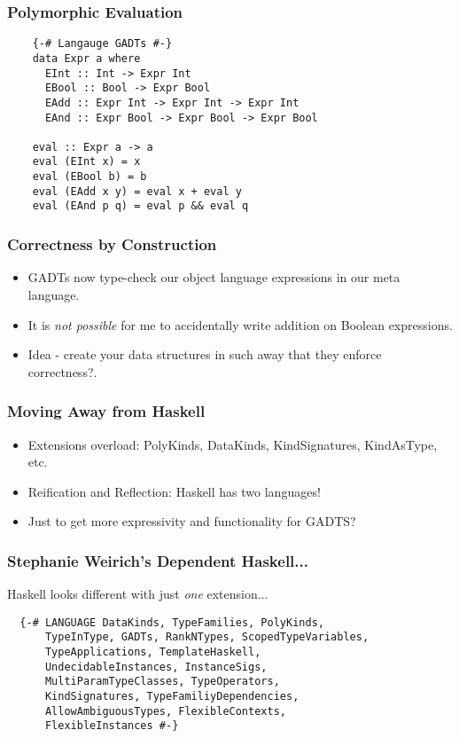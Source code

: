 \documentclass[hyperref={colorlinks = true,linkcolor = blue, citecolor = blue, urlcolor = blue}]{beamer}
\begin{document}
\begin{frame}[fragile]
\frametitle{Polymorphic Evaluation}
  \begin{verbatim}
    {-# Langauge GADTs #-}
    data Expr a where
      EInt :: Int -> Expr Int
      EBool :: Bool -> Expr Bool
      EAdd :: Expr Int -> Expr Int -> Expr Int
      EAnd :: Expr Bool -> Expr Bool -> Expr Bool

    eval :: Expr a -> a
    eval (EInt x) = x
    eval (EBool b) = b
    eval (EAdd x y) = eval x + eval y
    eval (EAnd p q) = eval p && eval q
  \end{verbatim}
\end{frame}

\begin{frame}[fragile]
\frametitle{Correctness by Construction}
\begin{itemize}
  \item GADTs now type-check our object language expressions in our meta language.
  \item It is \emph{not possible} for me to accidentally write addition on Boolean expressions.
  \item Idea - create your data structures in such away that they enforce correctness?.
\end{itemize}
\end{frame}

\begin{frame}[fragile]
  \frametitle{Moving Away from Haskell}
  \begin{itemize}
    \item Extensions overload: PolyKinds, DataKinds, KindSignatures, KindAsType, etc.
    \item Reification and Reflection: Haskell has two languages!
    \item Just to get more expressivity and functionality for GADTS?
  \end{itemize}
\end{frame}

\begin{frame}[fragile]
  \frametitle{Stephanie Weirich's Dependent Haskell...}
  Haskell looks different with just \emph{one} extension...
  \begin{verbatim}
  {-# LANGUAGE DataKinds, TypeFamilies, PolyKinds, 
      TypeInType, GADTs, RankNTypes, ScopedTypeVariables,
      TypeApplications, TemplateHaskell, 
      UndecidableInstances, InstanceSigs, 
      MultiParamTypeClasses, TypeOperators, 
      KindSignatures, TypeFamiliyDependencies, 
      AllowAmbiguousTypes, FlexibleContexts, 
      FlexibleInstances #-}
  \end{verbatim}
\end{frame}
\end{document}
